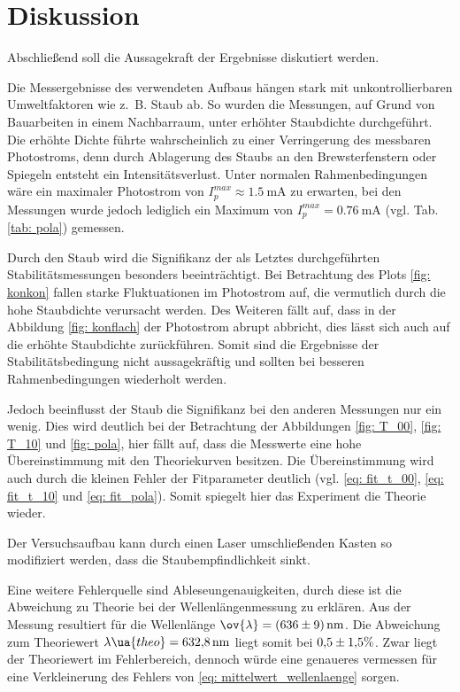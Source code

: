 \section{Diskussion}
Abschließend soll die Aussagekraft der Ergebnisse diskutiert werden.

Die Messergebnisse des verwendeten Aufbaus hängen stark mit
unkontrollierbaren Umweltfaktoren wie z.\, B. Staub ab.
So wurden die Messungen, auf Grund von Bauarbeiten in einem Nachbarraum,
unter erhöhter Staubdichte durchgeführt. Die erhöhte Dichte führte wahrscheinlich zu einer Verringerung des
messbaren Photostroms, denn durch Ablagerung des Staubs an den Brewsterfenstern oder Spiegeln entsteht ein
Intensitätsverlust. Unter normalen Rahmenbedingungen wäre ein
maximaler Photostrom von $I_{p}^{max}\approx\SI{1.5}{\milli\ampere}$ zu erwarten,
bei den Messungen wurde jedoch lediglich ein Maximum von $I_{p}^{max}=\SI{0.76}{\milli\ampere}$
(vgl. Tab. \ref{tab: pola}) gemessen.

Durch den Staub wird die Signifikanz der als Letztes durchgeführten Stabilitätsmessungen besonders beeinträchtigt.
Bei Betrachtung des Plots \ref{fig: konkon} fallen starke Fluktuationen im Photostrom auf,
die vermutlich durch die hohe Staubdichte verursacht werden. Des Weiteren fällt auf, dass
in der Abbildung \ref{fig: konflach} der Photostrom abrupt abbricht, dies lässt sich
auch auf die erhöhte Staubdichte zurückführen. Somit sind die Ergebnisse der Stabilitätsbedingung nicht aussagekräftig und sollten
bei besseren Rahmenbedingungen wiederholt werden.

Jedoch beeinflusst der Staub die Signifikanz bei den anderen Messungen nur ein wenig.
Dies wird deutlich bei der Betrachtung der Abbildungen \ref{fig: T_00}, \ref{fig: T_10} und \ref{fig: pola},
hier fällt auf, dass die Messwerte eine hohe Übereinstimmung mit den Theoriekurven besitzen.
Die Übereinstimmung wird auch durch die kleinen Fehler der Fitparameter deutlich
(vgl. \eqref{eq: fit_t_00}, \eqref{eq: fit_t_10} und \eqref{eq: fit_pola}).
Somit spiegelt hier das Experiment die Theorie wieder.

Der Versuchsaufbau kann durch einen Laser umschließenden Kasten so modifiziert werden,
dass die Staubempfindlichkeit sinkt.

Eine weitere Fehlerquelle sind Ableseungenauigkeiten,
durch diese ist die Abweichung zu Theorie bei der Wellenlängenmessung zu erklären.
Aus der Messung resultiert für die Wellenlänge $\ov{\lambda}=\SI{636\pm9}{\nano\meter}$.
Die Abweichung zum Theoriewert $\lambda\ua{theo}=\SI{632.8}{\nano\meter}$ \cite{anleitung61}
liegt somit bei $\num{0.5\pm 1.5} \%$. Zwar liegt der Theoriewert im Fehlerbereich, dennoch
würde eine genaueres vermessen für eine Verkleinerung des Fehlers von \eqref{eq: mittelwert_wellenlaenge} sorgen.
